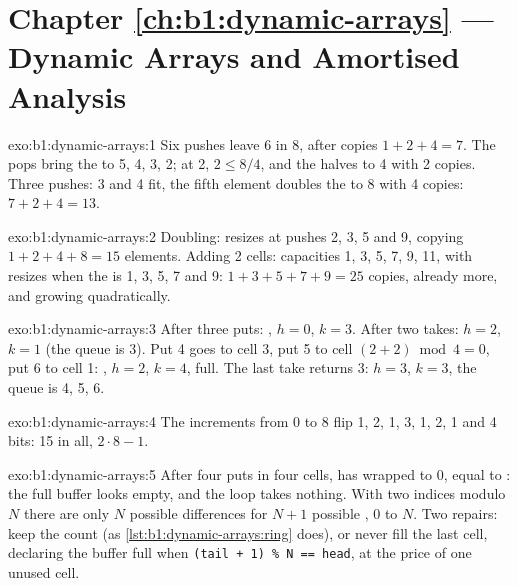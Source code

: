 \section*{Chapter \ref{ch:b1:dynamic-arrays} --- Dynamic Arrays and Amortised Analysis}

\begin{solution}{exo:b1:dynamic-arrays:1}
Six pushes leave  6 in  8, after copies $1 + 2 + 4 = 7$. The pops bring the  to 5, 4, 3, 2; at 2, $2 \leq
8/4$, and the  halves to 4 with 2 copies. Three pushes:  3 and 4 fit, the fifth element doubles the
 to 8 with 4 copies: $7 + 2 + 4 = 13$.
\end{solution}

\begin{solution}{exo:b1:dynamic-arrays:2}
Doubling: resizes at pushes 2, 3, 5 and 9, copying $1 + 2 + 4 + 8 = 15$ elements. Adding 2 cells: capacities 1, 3, 5, 7,
9, 11, with resizes when the  is 1, 3, 5, 7 and 9: $1 + 3 + 5 + 7 + 9 = 25$ copies, already more, and growing
quadratically.
\end{solution}

\begin{solution}{exo:b1:dynamic-arrays:3}
After three puts: \code{[1 2 3 .]}, $h = 0$, $k = 3$. After two takes: $h = 2$, $k = 1$ (the queue is 3). Put 4 goes to
cell 3, put 5 to cell $(2 + 2) \bmod 4 = 0$, put 6 to cell 1: \code{[5 6 3 4]}, $h = 2$, $k = 4$, full. The last take
returns 3: $h = 3$, $k = 3$, the queue is 4, 5, 6.
\end{solution}

\begin{solution}{exo:b1:dynamic-arrays:4}
The increments from 0 to 8 flip 1, 2, 1, 3, 1, 2, 1 and 4 bits: 15 in all, $2 \cdot 8 - 1$.
\end{solution}

\begin{solution}{exo:b1:dynamic-arrays:5}
After four puts in four cells,  has wrapped to 0, equal to : the full buffer looks empty, and the
loop takes nothing. With two indices modulo $N$ there are only $N$ possible differences  for $N + 1$
possible , 0 to $N$. Two repairs: keep the count (as \cref{lst:b1:dynamic-arrays:ring} does), or never fill the last
cell, declaring the buffer full when \texttt{(tail + 1) \% N == head}, at the price of one unused cell.
\end{solution}

